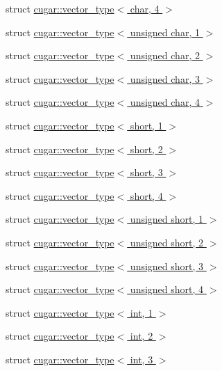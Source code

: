 \begin{DoxyCompactItemize}
\item 
struct \hyperlink{structcugar_1_1vector__type_3_01char_00_014_01_4}{cugar\+::vector\+\_\+type$<$ char, 4 $>$}
\item 
struct \hyperlink{structcugar_1_1vector__type_3_01unsigned_01char_00_011_01_4}{cugar\+::vector\+\_\+type$<$ unsigned char, 1 $>$}
\item 
struct \hyperlink{structcugar_1_1vector__type_3_01unsigned_01char_00_012_01_4}{cugar\+::vector\+\_\+type$<$ unsigned char, 2 $>$}
\item 
struct \hyperlink{structcugar_1_1vector__type_3_01unsigned_01char_00_013_01_4}{cugar\+::vector\+\_\+type$<$ unsigned char, 3 $>$}
\item 
struct \hyperlink{structcugar_1_1vector__type_3_01unsigned_01char_00_014_01_4}{cugar\+::vector\+\_\+type$<$ unsigned char, 4 $>$}
\item 
struct \hyperlink{structcugar_1_1vector__type_3_01short_00_011_01_4}{cugar\+::vector\+\_\+type$<$ short, 1 $>$}
\item 
struct \hyperlink{structcugar_1_1vector__type_3_01short_00_012_01_4}{cugar\+::vector\+\_\+type$<$ short, 2 $>$}
\item 
struct \hyperlink{structcugar_1_1vector__type_3_01short_00_013_01_4}{cugar\+::vector\+\_\+type$<$ short, 3 $>$}
\item 
struct \hyperlink{structcugar_1_1vector__type_3_01short_00_014_01_4}{cugar\+::vector\+\_\+type$<$ short, 4 $>$}
\item 
struct \hyperlink{structcugar_1_1vector__type_3_01unsigned_01short_00_011_01_4}{cugar\+::vector\+\_\+type$<$ unsigned short, 1 $>$}
\item 
struct \hyperlink{structcugar_1_1vector__type_3_01unsigned_01short_00_012_01_4}{cugar\+::vector\+\_\+type$<$ unsigned short, 2 $>$}
\item 
struct \hyperlink{structcugar_1_1vector__type_3_01unsigned_01short_00_013_01_4}{cugar\+::vector\+\_\+type$<$ unsigned short, 3 $>$}
\item 
struct \hyperlink{structcugar_1_1vector__type_3_01unsigned_01short_00_014_01_4}{cugar\+::vector\+\_\+type$<$ unsigned short, 4 $>$}
\item 
struct \hyperlink{structcugar_1_1vector__type_3_01int_00_011_01_4}{cugar\+::vector\+\_\+type$<$ int, 1 $>$}
\item 
struct \hyperlink{structcugar_1_1vector__type_3_01int_00_012_01_4}{cugar\+::vector\+\_\+type$<$ int, 2 $>$}
\item 
struct \hyperlink{structcugar_1_1vector__type_3_01int_00_013_01_4}{cugar\+::vector\+\_\+type$<$ int, 3 $>$}

\end{DoxyCompactItemize}
